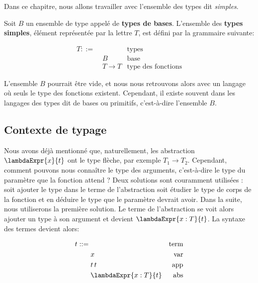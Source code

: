 Dans ce chapitre, nous allons travailler avec l'ensemble des types dit
\textit{simples}.

\begin{definition}
  Soit $B$ un ensemble de type appelé de \textbf{types de bases}.
  L'ensemble des \textbf{types simples}, élément représentée par la lettre $T$,
  est défini par la grammaire suivante:

  \begin{align*}
    T ::= & \, & \text{types} \\
          & \; B & \text{base} \\
          & \; T \rightarrow T & \text{type des fonctions}
  \end{align*}
\end{definition}

L'ensemble $B$ pourrait être vide, et nous nous retrouvons alors avec un langage
où seuls le type des fonctions existent. Cependant, il existe souvent dans les
langages des types dit de bases ou primitifs, c'est-à-dire l'ensemble $B$.



\subsection*{Contexte de typage}

Nous avons déjà mentionné que, naturellement, les abstraction $\lambdaExpr{x}{t}$ ont le type
flèche, par exemple $T_{1} \rightarrow T_{2}$. Cependant, comment pouvons nous
connaître le type des arguments, c'est-à-dire le type du paramètre que la
fonction attend ? Deux solutions sont couramment utilisées : soit ajouter le type
dans le terme de l'abstraction soit étudier le type de corps de la fonction et
en déduire le type que le paramètre devrait avoir.
Dans la suite, nous utiliserons la première solution. Le terme de l'abstraction
se voit alors ajouter un type à son argument et devient $\lambdaExpr{x : T}{t}$.
La syntaxe des termes devient alors:

\begin{align*}
  t ::= & \, & \text{term} \\
        & \; x & \text{var} \\
        & \; t \, t & \text{app} \\
        & \; \lambdaExpr{x : T}{t} & \text{abs}
\end{align*}


